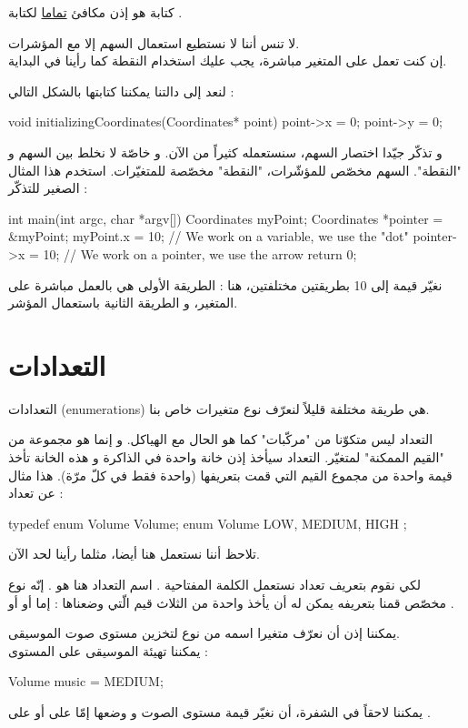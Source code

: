 كتابة
هو إذن مكافئ
\underline{تماما}
لكتابة
.
\begin{warning}
  لا تنس أننا لا نستطيع استعمال السهم إلا مع المؤشرات.\\
إن كنت تعمل على المتغير مباشرة، يجب عليك استخدام النقطة كما رأينا في البداية.
\end{warning}
لنعد إلى دالتنا
يمكننا كتابتها بالشكل التالي :
\begin{Csource}
void initializingCoordinates(Coordinates* point)
{
	point->x = 0;
	point->y = 0;
}
\end{Csource}
و تذكّر جيّدا اختصار السهم، سنستعمله كثيراً من الآن. و خاصّة لا نخلط بين السهم و "النقطة". السهم مخصّص للمؤشّرات، "النقطة" مخصّصة للمتغيّرات. استخدم هذا المثال الصغير للتذكّر :
\begin{Csource}
int main(int argc, char *argv[])
{
	Coordinates  myPoint;
	Coordinates *pointer = &myPoint;
	myPoint.x = 10; // We work on a variable, we use the "dot"
	pointer->x = 10; // We work on a pointer, we use the arrow
	return 0;
}
\end{Csource}
نغيّر قيمة
إلى 10 بطريقتين مختلفتين، هنا : الطريقة الأولى هي بالعمل مباشرة على المتغير، و الطريقة الثانية باستعمال المؤشر.

\section{التعدادات}
التعدادات
(\textenglish{enumerations})
هي طريقة مختلفة قليلاً لنعرّف نوع متغيرات خاص بنا.

التعداد ليس متكوّنا من "مركّبات"  كما هو الحال مع الهياكل. و إنما هو مجموعة من "القيم الممكنة" لمتغيّر. التعداد سيأخذ إذن خانة واحدة في الذاكرة و هذه الخانة تأخذ قيمة واحدة من مجموع القيم التي قمت بتعريفها (واحدة فقط في كلّ مرّة).
هذا مثال عن تعداد :
\begin{Csource}
typedef enum Volume Volume;
enum Volume
{
	LOW, MEDIUM, HIGH
};
\end{Csource}
تلاحظ أننا نستعمل
هنا أيضا، مثلما رأينا لحد الآن.

لكي نقوم بتعريف تعداد نستعمل الكلمة المفتاحية
.
اسم التعداد هنا هو
.
إنّه نوع مخصّص قمنا بتعريفه يمكن له أن يأخذ واحدة من الثلاث قيم الّتي وضعناها : إما
أو
أو
.

يمكننا إذن أن نعرّف متغيرا اسمه
من نوع
لتخزين مستوى صوت الموسيقى.\\
يمكننا تهيئة الموسيقى على المستوى
 :
\begin{Csource}
Volume music = MEDIUM;
\end{Csource}
يمكننا لاحقاً في الشفرة، أن نغيّر قيمة مستوى الصوت و وضعها إمّا على
أو على
.

